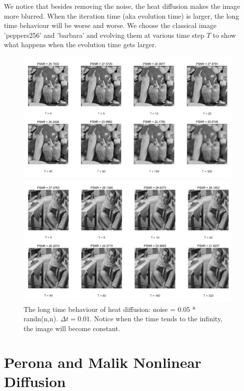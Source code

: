 \documentclass{article}
\begin{document}
We notice that besides removing the noise, the heat diffusion makes the image more blurred. When the iteration time (aka evolution time) is larger, the long time behaviour will be worse and worse. We choose the classical image 'peppers256' and 'barbara' and evolving them at various time step $T$ to show what happens when the evolution time gets larger.

\begin{figure}[H]
\label{fig:heat-l-c}
\begin{center}
\includegraphics[scale=.38]{1.png}

\includegraphics[scale=.38]{2.png}
\end{center}
\caption{The long time behaviour of heat diffusion: noise = 0.05 * randn(n,n). $\Delta t = 0.01$. Notice when the time tends to the infinity, the image will become constant.} 
\end{figure}

\section{Perona and Malik Nonlinear Diffusion}
\end{document}
